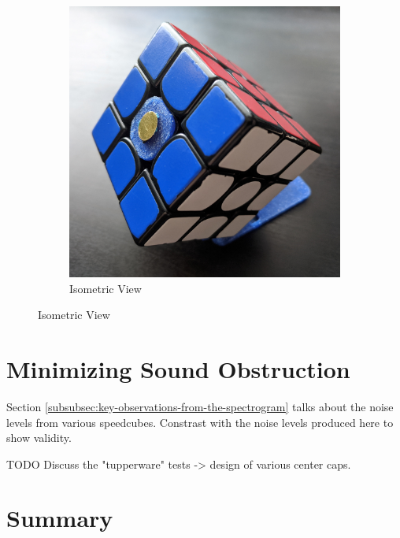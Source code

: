 \begin{figure}[h]
\begin{subfigure}{.30\textwidth}
    \end{subfigure}
    \begin{subfigure}{.30\textwidth}
        \centering
        \caption{Isometric View}
        \label{fig:core-placement-isometric}
        \includegraphics[width=\linewidth]{Figures/6 PCB Design/core_placement_isometric_square.jpg}
    \end{subfigure}
\end{figure}

\section{Minimizing Sound Obstruction}
Section \ref{subsubsec:key-observations-from-the-spectrogram} talks about the noise levels from various speedcubes. Constrast with the noise levels produced here to show validity.

TODO Discuss the "tupperware" tests -> design of various center caps.

\section{Summary}
